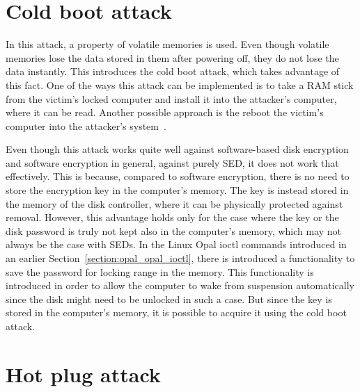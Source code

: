 

\section{Cold boot attack}
\label{cold_boot_attack}

In this attack, a property of volatile memories is used. Even though volatile memories lose the data stored in them after powering off, they do not lose the data instantly. This introduces the cold boot attack, which takes advantage of this fact. One of the ways this attack can be implemented is to take a RAM stick from the victim's locked computer and install it into the attacker's computer, where it can be read. Another possible approach is the reboot the victim's computer into the attacker's system~\cite{self_decrypting_risks}.

\REPLACEME

Even though this attack works quite well against software-based disk encryption and software encryption in general, against purely SED, it does not work that effectively. This is because, compared to software encryption, there is no need to store the encryption key in the computer's memory. The key is instead stored in the memory of the disk controller, where it can be physically protected against removal.
However, this advantage holds only for the case where the key or the disk password is truly not kept also in the computer's memory, which may not always be the case with SEDs. In the Linux Opal ioctl commands introduced in an earlier Section~\ref{section:opal_opal_ioctl}, there is introduced a functionality to save the password for locking range in the memory. This functionality is introduced in order to allow the computer to wake from suspension automatically since the disk might need to be unlocked in such a case. But since the key is stored in the computer's memory, it is possible to acquire it using the cold boot attack.

\section{Hot plug attack}

